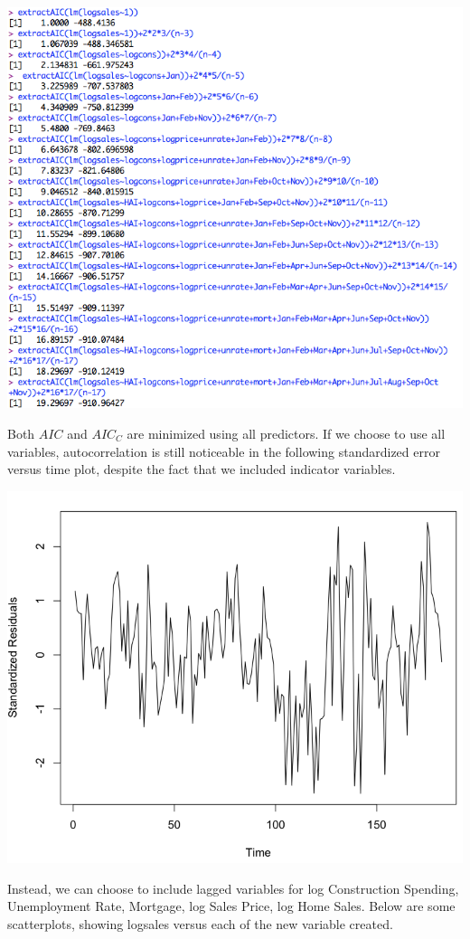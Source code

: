 \documentclass[a4 paper, 11 pt]{article}
\begin{document}
\begin{center}
\includegraphics[scale=0.4]{AICC2}
\end{center}
Both $AIC$ and $AIC_C$ are minimized using all  predictors. If we choose to use all variables, autocorrelation is still noticeable in the following standardized error versus time plot, despite the fact that we included indicator variables.
\begin{center}
\includegraphics[scale=0.4]{all}
\end{center}
Instead, we can choose to include lagged variables for log Construction Spending, Unemployment Rate, Mortgage, log Sales Price, log Home Sales. Below are some scatterplots, showing logsales versus each of the new variable created.
\end{document}
